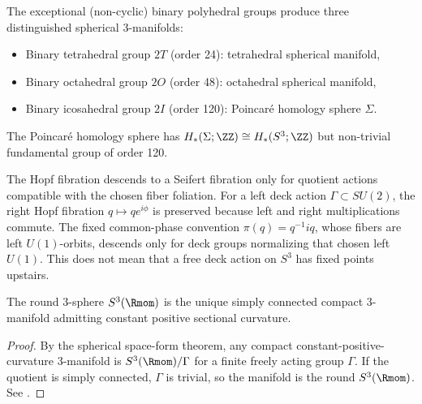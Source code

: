 \documentclass[11pt]{article}
\begin{document}
The exceptional (non-cyclic) binary polyhedral groups produce three distinguished spherical 3-manifolds:

\begin{itemize}
\item Binary tetrahedral group $2T$ (order 24): tetrahedral spherical manifold,
\item Binary octahedral group $2O$ (order 48): octahedral spherical manifold,
\item Binary icosahedral group $2I$ (order 120): Poincaré homology sphere $\Sigma$.
\end{itemize}

The Poincaré homology sphere has $H_*(\Sigma;\ZZ) \cong H_*(S^3;\ZZ)$ but non-trivial fundamental group of order 120.

\begin{remark}
The Hopf fibration descends to a Seifert fibration only for quotient actions compatible with the chosen fiber foliation. For a left deck action \(\Gamma\subset SU(2)\), the right Hopf fibration \(q\mapsto q e^{i\phi}\) is preserved because left and right multiplications commute. The fixed common-phase convention \(\pi(q)=q^{-1}iq\), whose fibers are left \(U(1)\)-orbits, descends only for deck groups normalizing that chosen left \(U(1)\). This does not mean that a free deck action on \(S^3\) has fixed points upstairs.
\end{remark}

\begin{corollary}
\label{p1:cor:simply-connected-positive-curvature-model}
The round 3-sphere $S^3(\Rmom)$ is the unique simply connected compact 3-manifold admitting constant positive sectional curvature.
\cite{wolf2011spaces,do1992riemannian}
\end{corollary}

\begin{proof}
By the spherical space-form theorem, any compact constant-positive-curvature \(3\)-manifold is \(S^3(\Rmom)/\Gamma\) for a finite freely acting group \(\Gamma\). If the quotient is simply connected, \(\Gamma\) is trivial, so the manifold is the round \(S^3(\Rmom)\). See \cite{wolf2011spaces,do1992riemannian}.
\end{proof}
\end{document}

